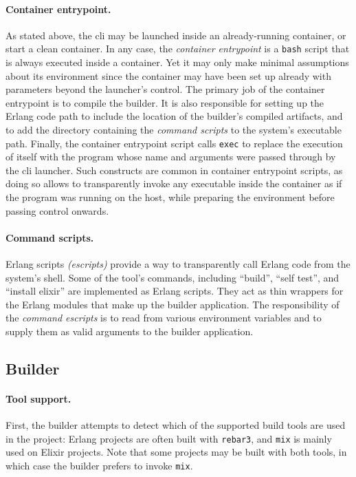 \paragraph{Container entrypoint.} As stated above, the \acrshort{cli} may be launched inside an already-running container, or start a clean container. In any case, the \emph{container entrypoint} is a \lstinline|bash| script that is always executed inside a container. Yet it may only make minimal assumptions about its environment since the container may have been set up already with parameters beyond the launcher's control. The primary job of the container entrypoint is to compile the builder. It is also responsible for setting up the Erlang code path to include the location of the builder's compiled artifacts, and to add the directory containing the \emph{command scripts} to the system's executable path. Finally, the container entrypoint script calls \lstinline|exec| to replace the execution of itself with the program whose name and arguments were passed through by the \acrshort{cli} launcher. Such constructs are common in container entrypoint scripts, as doing so allows to transparently invoke any executable inside the container as if the program was running on the host, while preparing the environment before passing control onwards.

\paragraph{Command scripts.} Erlang scripts \emph{(escripts)} provide a way to transparently call Erlang code from the system's shell. Some of the tool's commands, including ``build'', ``self test'', and ``install elixir'' are implemented as Erlang scripts. They act as thin wrappers for the Erlang modules that make up the builder application. The responsibility of the \emph{command escripts} is to read from various environment variables and to supply them as valid arguments to the builder application.


\subsection{Builder}

\paragraph{Tool support.} First, the builder attempts to detect which of the supported build tools are used in the project: Erlang projects are often built with \lstinline|rebar3|, and \lstinline|mix| is mainly used on Elixir projects. Note that some projects may be built with both tools, in which case the builder prefers to invoke \lstinline|mix|.

